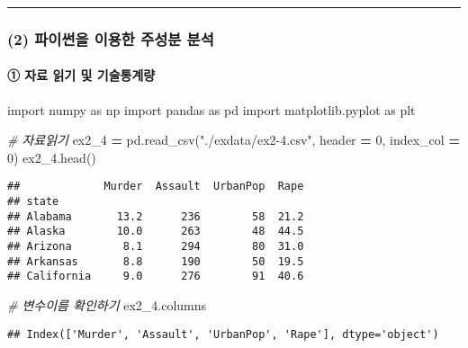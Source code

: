 \documentclass[
]{article}
\newenvironment{Shaded}{\begin{snugshade}}{\end{snugshade}}
\newcommand{\CommentTok}[1]{\textcolor[rgb]{0.56,0.35,0.01}{\textit{#1}}}
\newcommand{\DecValTok}[1]{\textcolor[rgb]{0.00,0.00,0.81}{#1}}
\newcommand{\ImportTok}[1]{#1}
\newcommand{\NormalTok}[1]{#1}
\newcommand{\OperatorTok}[1]{\textcolor[rgb]{0.81,0.36,0.00}{\textbf{#1}}}
\newcommand{\StringTok}[1]{\textcolor[rgb]{0.31,0.60,0.02}{#1}}
\begin{document}
\begin{center}\rule{0.5\linewidth}{0.5pt}\end{center}

\hypertarget{uxd30cuxc774uxc36cuxc744-uxc774uxc6a9uxd55c-uxc8fcuxc131uxbd84-uxbd84uxc11d}{%
\subsubsection{(2) 파이썬을 이용한 주성분
분석}\label{uxd30cuxc774uxc36cuxc744-uxc774uxc6a9uxd55c-uxc8fcuxc131uxbd84-uxbd84uxc11d}}

\hypertarget{uxc790uxb8cc-uxc77duxae30-uxbc0f-uxae30uxc220uxd1b5uxacc4uxb7c9}{%
\paragraph{① 자료 읽기 및
기술통계량}\label{uxc790uxb8cc-uxc77duxae30-uxbc0f-uxae30uxc220uxd1b5uxacc4uxb7c9}}

\begin{Shaded}
\begin{Highlighting}[]
\ImportTok{import}\NormalTok{ numpy }\ImportTok{as}\NormalTok{ np}
\ImportTok{import}\NormalTok{ pandas }\ImportTok{as}\NormalTok{ pd}
\ImportTok{import}\NormalTok{ matplotlib.pyplot }\ImportTok{as}\NormalTok{ plt}

\CommentTok{\# 자료읽기}
\NormalTok{ex2\_4 }\OperatorTok{=}\NormalTok{ pd.read\_csv(}\StringTok{"./exdata/ex2{-}4.csv"}\NormalTok{, header }\OperatorTok{=} \DecValTok{0}\NormalTok{, index\_col }\OperatorTok{=} \DecValTok{0}\NormalTok{)}
\NormalTok{ex2\_4.head()}
\end{Highlighting}
\end{Shaded}

\begin{verbatim}
##             Murder  Assault  UrbanPop  Rape
## state                                      
## Alabama       13.2      236        58  21.2
## Alaska        10.0      263        48  44.5
## Arizona        8.1      294        80  31.0
## Arkansas       8.8      190        50  19.5
## California     9.0      276        91  40.6
\end{verbatim}

\begin{Shaded}
\begin{Highlighting}[]
\CommentTok{\# 변수이름 확인하기}
\NormalTok{ex2\_4.columns}
\end{Highlighting}
\end{Shaded}

\begin{verbatim}
## Index(['Murder', 'Assault', 'UrbanPop', 'Rape'], dtype='object')
\end{verbatim}
\end{document}

